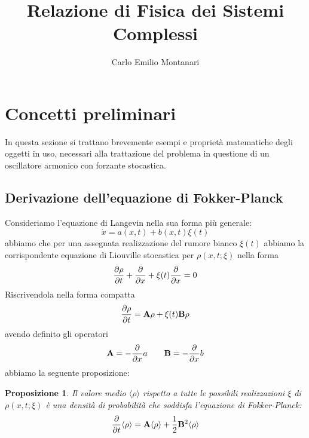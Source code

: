 \documentclass[10pt,a4paper]{article}
\title{Relazione di Fisica dei Sistemi Complessi}
\author{Carlo Emilio Montanari}
\newtheorem{prop}{Proposizione}[section]
\begin{document}
\maketitle

\tableofcontents

\section{Concetti preliminari}
In questa sezione si trattano brevemente esempi e proprietà matematiche degli oggetti in uso, necessari alla trattazione del problema in questione di un oscillatore armonico con forzante stocastica.

\subsection{Derivazione dell'equazione di Fokker-Planck}
Consideriamo l'equazione di Langevin nella sua forma più generale:
\begin{equation}
	\dot{x} = a(x,t) + b(x,t)\xi(t)
\end{equation}
abbiamo che per una assegnata realizzazione del rumore bianco $\xi(t)$ abbiamo la corrispondente equazione di Liouville stocastica per $\rho(x,t;\xi)$ nella forma
\begin{equation}
	\pdv{\rho}{t} + \pdv{}{x}(a\rho) + \xi(t)\pdv{}{x}(b\rho)=0
\end{equation}
Riscrivendola nella forma compatta
\begin{equation}
	\pdv{\rho}{t} = \vb{A}\rho +\xi(t)\vb{B}\rho
\end{equation}
avendo definito gli operatori
\begin{equation}
	\vb{A} = -\pdv{}{x} a \quad\quad \vb{B} = - \pdv{}{x} b 
\end{equation}
abbiamo la seguente proposizione:
\begin{prop}
	Il valore medio $\langle\rho\rangle$ rispetto a tutte le possibili realizzazioni $\xi$ di $\rho(x,t;\xi)$ è una densità di probabilità che soddisfa l'equazione di Fokker-Planck:
	\begin{equation}
		\pdv{}{t}\langle\rho\rangle = \vb{A}\langle\rho\rangle + \frac{1}{2}\vb{B}^2\langle\rho\rangle
	\end{equation}
\end{prop}
\end{document}
